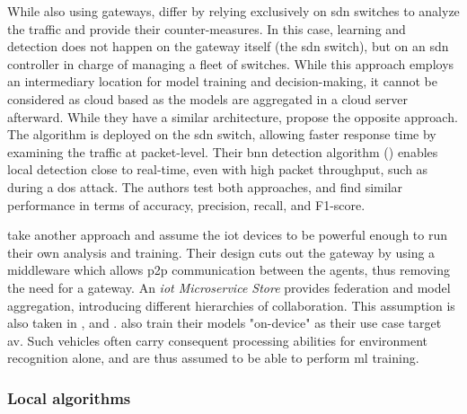 While also using gateways, \textcite{rathore_BlockSecIoTNetBlockchainbaseddecentralized_2019} differ by relying exclusively on \gls{sdn} switches to analyze the traffic and provide their counter-measures.
In this case, learning and detection does not happen on the gateway itself (the \gls{sdn} switch), but on an \gls{sdn} controller in charge of managing a fleet of switches.
While this approach employs an intermediary location for model training and decision-making, it cannot be considered as cloud based as the models are aggregated in a cloud server afterward.
While they have a similar architecture, \textcite{qin_LineSpeedScalableIntrusion_2020a} propose the opposite approach.
The algorithm is deployed on the \gls{sdn} switch, allowing faster response time by examining the traffic at packet-level.
Their \gls{bnn} detection algorithm () enables local detection close to real-time, even with high packet throughput, such as during a \gls{dos} attack.
The authors test both approaches, and find similar performance in terms of accuracy, precision, recall, and F1-score.

\textcite{pahl_AllEyesYou_2018} take another approach and assume the \gls{iot} devices to be powerful enough to run their own analysis and training.
Their design cuts out the gateway by using a middleware which allows \gls{p2p} communication between the agents, thus removing the need for a gateway.
An \emph{\gls{iot} Microservice Store} provides federation and model aggregation, introducing different hierarchies of collaboration.
This assumption is also taken in \cite{rahman_InternetThingsIntrusion_2020}, \cite{hei_trustedfeatureaggregator_2020} and \cite{qin_FederatedLearningBasedNetwork_2021}.
\textcite{liu_BlockchainFederatedLearning_2021} also train their models "on-device" as their use case target \gls{av}.
Such vehicles often carry consequent processing abilities for environment recognition alone, and are thus assumed to be able to perform \gls{ml} training.

\subsubsection{Local algorithms}
\label{sec:sota.quali.alg}

